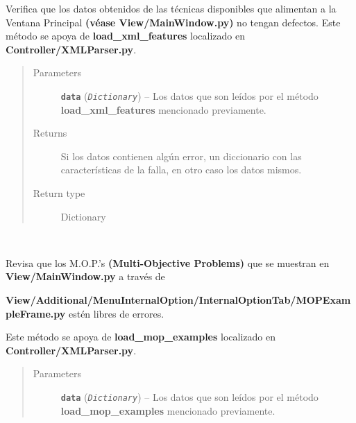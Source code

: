 \documentclass[letterpaper,10pt,english]{sphinxmanual}
\begin{document}
\begin{fulllineitems}
\begin{fulllineitems}
\label{Controller/Verifier:Controller.Verifier.Verifier.verify_load_xml_features}
Verifica que los datos obtenidos de las técnicas disponibles que alimentan 
a la Ventana Principal \textbf{(véase View/MainWindow.py)} no tengan defectos.
Este método se apoya de \textbf{load\_xml\_features} localizado en 
\textbf{Controller/XMLParser.py}.
\begin{quote}\begin{description}
\item[{Parameters}] \leavevmode
\textbf{\texttt{data}} (\emph{\texttt{Dictionary}}) -- Los datos que son leídos por el método \textbf{load\_xml\_features}
mencionado previamente.

\item[{Returns}] \leavevmode
Si los datos contienen algún error, un diccionario con las características
de la falla, en otro caso los datos mismos.

\item[{Return type}] \leavevmode
Dictionary

\end{description}\end{quote}

\end{fulllineitems}


\begin{fulllineitems}
\label{Controller/Verifier:Controller.Verifier.Verifier.verify_load_xml_mop_examples}~
\begin{DUlineblock}{0em}
\item[] Revisa que los M.O.P.'s \textbf{(Multi-Objective Problems)}
que se muestran en \textbf{View/MainWindow.py} a través de
\item[] \textbf{View/Additional/MenuInternalOption/InternalOptionTab/MOPExampleFrame.py} 
estén libres de errores.
\item[] Este método se apoya de \textbf{load\_mop\_examples} localizado en 
\textbf{Controller/XMLParser.py}.
\end{DUlineblock}
\begin{quote}\begin{description}
\item[{Parameters}] \leavevmode
\textbf{\texttt{data}} (\emph{\texttt{Dictionary}}) -- Los datos que son leídos por el método \textbf{load\_mop\_examples}
mencionado previamente.


\end{description}
\end{quote}
\end{fulllineitems}
\end{fulllineitems}
\end{document}
